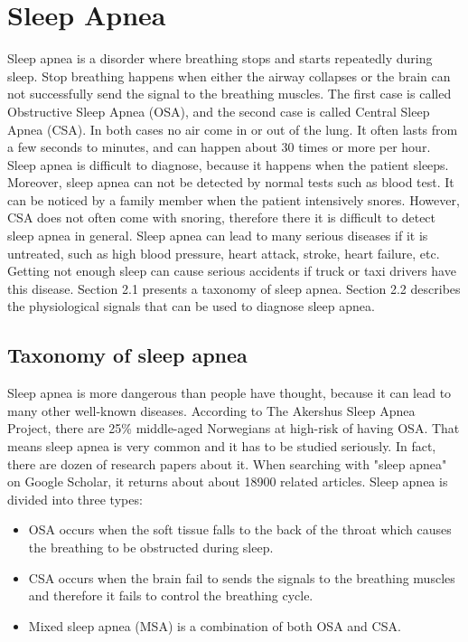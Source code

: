 \chapter{Sleep Apnea}

Sleep apnea is a disorder where breathing stops and starts repeatedly during sleep. Stop breathing happens when either the airway collapses or the brain can not successfully send the signal to the breathing muscles. The first case is called Obstructive Sleep Apnea (OSA), and the second case is called Central Sleep Apnea (CSA). In both cases no air come in or out of the lung. It often lasts from a few seconds to minutes, and can happen about 30 times or more per hour\cite{NHLBI}. Sleep apnea is difficult to diagnose, because it happens when the patient sleeps. Moreover, sleep apnea can not be detected by normal tests such as blood test. It can be noticed by a family member when the patient intensively snores. However, CSA does not often come with snoring, therefore there it is difficult to detect sleep apnea in general. Sleep apnea can lead to many serious diseases if it is untreated, such as high blood pressure, heart attack, stroke, heart failure, etc. Getting not enough sleep can cause serious accidents if truck or taxi drivers have this disease. Section 2.1 presents a taxonomy of sleep apnea. Section 2.2 describes the physiological signals that can be used to diagnose sleep apnea.

\section{Taxonomy of sleep apnea}
Sleep apnea is more dangerous than people have thought, because it can lead to many other well-known diseases. According to The Akershus Sleep Apnea Project, there are 25\% middle-aged Norwegians at high-risk of having OSA\cite{Akershus}. That means sleep apnea is very common and it has to be studied seriously. In fact, there are dozen of research papers about it. When searching with "sleep apnea" on Google Scholar, it returns about about 18900 related articles. Sleep apnea is divided into three types:

\begin{itemize}
  \item OSA occurs when the soft tissue falls to the back of the throat which causes the breathing to be obstructed during sleep.
  \item CSA occurs when the brain fail to sends the signals to the breathing muscles and therefore it fails to control the breathing cycle.
  \item Mixed sleep apnea (MSA) is a combination of both OSA and CSA.
\end{itemize}

